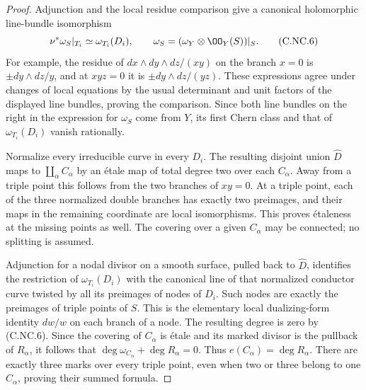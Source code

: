 \begin{proof}
Adjunction and the local residue comparison give a canonical holomorphic line-bundle isomorphism
\[
 \nu^*\omega_S|_{T_i}\simeq\omega_{T_i}(D_i),
 \qquad \omega_S=(\omega_Y\otimes\OO_Y(S))|_S.
 \tag{C.NC.6}
\]
For example, the residue of $dx\wedge dy\wedge dz/(xy)$ on the branch $x=0$ is $\pm dy\wedge dz/y$, and at $xyz=0$ it is $\pm dy\wedge dz/(yz)$. These expressions agree under changes of local equations by the usual determinant and unit factors of the displayed line bundles, proving the comparison. Since both line bundles on the right in the expression for $\omega_S$ come from $Y$, its first Chern class and that of $\omega_{T_i}(D_i)$ vanish rationally.

Normalize every irreducible curve in every $D_i$. The resulting disjoint union $\widehat D$ maps to $\coprod_\alpha C_\alpha$ by an étale map of total degree two over each $C_\alpha$. Away from a triple point this follows from the two branches of $xy=0$. At a triple point, each of the three normalized double branches has exactly two preimages, and their maps in the remaining coordinate are local isomorphisms. This proves étaleness at the missing points as well. The covering over a given $C_\alpha$ may be connected; no splitting is assumed.

Adjunction for a nodal divisor on a smooth surface, pulled back to $\widehat D$, identifies the restriction of $\omega_{T_i}(D_i)$ with the canonical line of that normalized conductor curve twisted by all its preimages of nodes of $D_i$. Such nodes are exactly the preimages of triple points of $S$. This is the elementary local dualizing-form identity $dw/w$ on each branch of a node. The resulting degree is zero by (C.NC.6). Since the covering of $C_\alpha$ is étale and its marked divisor is the pullback of $R_\alpha$, it follows that
$\deg\omega_{C_\alpha}+\deg R_\alpha=0$.
Thus $e(C_\alpha)=\deg R_\alpha$. There are exactly three marks over every triple point, even when two or three belong to one $C_\alpha$, proving their summed formula.


\end{proof}
